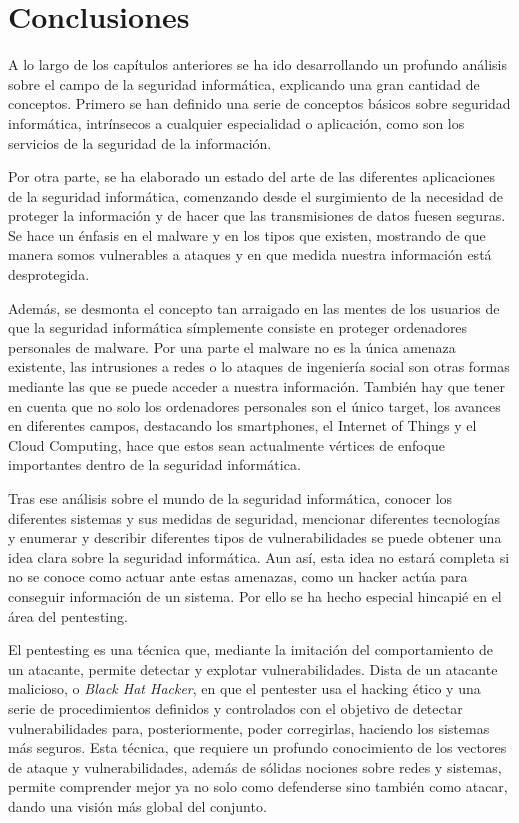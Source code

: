 \chapter{Conclusiones}

A lo largo de los capítulos anteriores se ha ido desarrollando un profundo análisis sobre el campo de la seguridad informática, explicando una gran cantidad de conceptos. Primero se han definido una serie de conceptos básicos sobre seguridad informática, intrínsecos a cualquier especialidad o aplicación, como son los servicios de la seguridad de la información.

Por otra parte, se ha elaborado un estado del arte de las diferentes aplicaciones de la seguridad informática, comenzando desde el surgimiento de la necesidad de proteger la información y de hacer que las transmisiones de datos fuesen seguras. Se hace un énfasis en el malware y en los tipos que existen, mostrando de que manera somos vulnerables a ataques y en que medida nuestra información está desprotegida. 

Además, se desmonta el concepto tan arraigado en las mentes de los usuarios de que la seguridad informática símplemente consiste en proteger ordenadores personales de malware. Por una parte el malware no es la única amenaza existente, las intrusiones a redes o lo ataques de ingeniería social son otras formas mediante las que se puede acceder a nuestra información. También hay que tener en cuenta que no solo los ordenadores personales son el único target, los avances en diferentes campos, destacando los smartphones, el Internet of Things y el Cloud Computing, hace que estos sean actualmente vértices de enfoque importantes dentro de la seguridad informática.

Tras ese análisis sobre el mundo de la seguridad informática, conocer los diferentes sistemas y sus medidas de seguridad, mencionar diferentes tecnologías y enumerar y describir diferentes tipos de vulnerabilidades se puede obtener una idea clara sobre la seguridad informática. Aun así, esta idea no estará completa si no se conoce como actuar ante estas amenazas, como un hacker actúa para conseguir información de un sistema. Por ello se ha hecho especial hincapié en el área del pentesting. 

El pentesting es una técnica que, mediante la imitación del comportamiento de un atacante, permite detectar y explotar vulnerabilidades. Dista de un atacante malicioso, o \textit{Black Hat Hacker}, en que el pentester usa el hacking ético y una serie de procedimientos definidos y controlados con el objetivo de detectar vulnerabilidades para, posteriormente, poder corregirlas, haciendo los sistemas más seguros. Esta técnica, que requiere un profundo conocimiento de los vectores de ataque y vulnerabilidades, además de sólidas nociones sobre redes y sistemas, permite comprender mejor ya no solo como defenderse sino también como atacar, dando una visión más global del conjunto.


